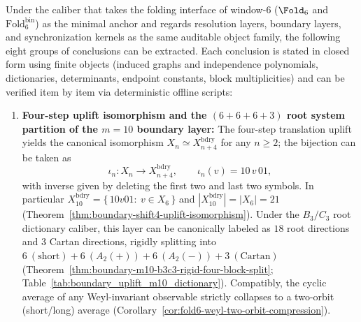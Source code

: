 \begin{theorem}\label{thm:window6-unified-skeleton}
Under the caliber that takes the folding interface of window-\(6\) (\(\Fold_6\) and \(\mathrm{Fold}^{\mathrm{bin}}_6\)) as the minimal anchor and regards resolution layers, boundary layers, and synchronization kernels as the same auditable object family, the following eight groups of conclusions can be extracted. Each conclusion is stated in closed form using finite objects (induced graphs and independence polynomials, dictionaries, determinants, endpoint constants, block multiplicities) and can be verified item by item via deterministic offline scripts:
\begin{enumerate}
  \item \textbf{Four-step uplift isomorphism and the \texorpdfstring{$(6+6+6+3)$}{(6+6+6+3)} root system partition of the \(m=10\) boundary layer:}
  The four-step translation uplift yields the canonical isomorphism \(X_n\simeq X_{n+4}^{\mathrm{bdry}}\) for any \(n\ge 2\); the bijection can be taken as
  \[
  \iota_n:X_n\to X_{n+4}^{\mathrm{bdry}},
  \qquad
  \iota_n(v)=10\,v\,01,
  \]
  with inverse given by deleting the first two and last two symbols. In particular
  \(
  X_{10}^{\mathrm{bdry}}=\{\,10v01:\ v\in X_6\,\}
  \)
  and \(|X_{10}^{\mathrm{bdry}}|=|X_6|=21\) (Theorem~\ref{thm:boundary-shift4-uplift-isomorphism}).
  Under the \(B_3/C_3\) root dictionary caliber, this layer can be canonically labeled as \(18\) root directions and \(3\) Cartan directions, rigidly splitting into
  \(
  6\ (\mathrm{short})+6\ (A_2(+))+6\ (A_2(-))+3\ (\mathrm{Cartan})
  \)
  (Theorem~\ref{thm:boundary-m10-b3c3-rigid-four-block-split}; Table~\ref{tab:boundary_uplift_m10_dictionary}).
  Compatibly, the cyclic average of any Weyl-invariant observable strictly collapses to a two-orbit (short/long) average (Corollary~\ref{cor:fold6-weyl-two-orbit-compression}).


\end{enumerate}
\end{theorem}

